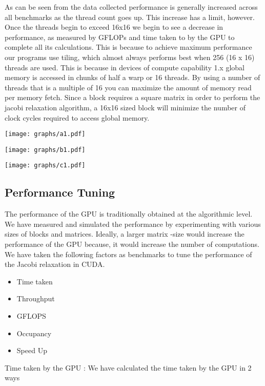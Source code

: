\documentclass[10pt]{article}
\makeatletter
\newenvironment{figurehere}
{\def\@captype{figure}}
{}
\makeatother
\begin{document}
\begin{multicols}{2}
  As can be seen from the data collected performance is generally increased across all benchmarks as the thread count goes up.
  This increase has a limit, however.
  Once the threads begin to exceed 16x16 we begin to see a decrease in performance, as measured by GFLOPs and time taken to by the GPU to complete all its calculations.
  This is because to achieve maximum performance our programs use tiling, which almost always performs best when 256 (16 x 16) threads are used.
  This is because in devices of compute capability 1.x global memory is accessed in chunks of half a warp or 16 threads.
  By using a number of threads that is a multiple of 16 you can maximize the amount of memory read per memory fetch.
  Since a block requires a square matrix in order to perform the jacobi relaxation algorithm, a 16x16 sized block will minimize the number of clock cycles required to access global memory.

  \begin{figurehere}
    \centering
    \texttt{[image: graphs/a1.pdf]}
    \caption{}
    \label{fig:time_taken1}
  \end{figurehere}

  \begin{figurehere}
    \centering
    \texttt{[image: graphs/b1.pdf]}
    \caption{}
    \label{fig:time_taken2}
  \end{figurehere}

  \begin{figurehere}
    \centering
    \texttt{[image: graphs/c1.pdf]}
    \caption{}
    \label{fig:time_taken3}
  \end{figurehere}

  \subsection{Performance Tuning}
  The performance of the GPU is traditionally obtained at the algorithmic level.
  We have measured and simulated the performance by experimenting with various sizes of blocks and matrices.
  Ideally, a larger matrix -size would increase the performance of the GPU because,  it would increase  the  number of computations.
  We have taken the following factors as benchmarks to tune the performance of the Jacobi relaxation in CUDA.
  \begin{itemize}
    \item Time taken
    \item Throughput
    \item GFLOPS
    \item Occupancy
    \item Speed Up
  \end{itemize}
  Time taken by the GPU  : We have calculated the time taken by the GPU in 2 ways


\end{multicols}
\end{document}
